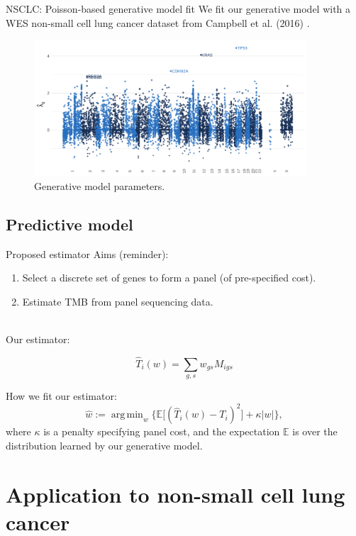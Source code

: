 \documentclass{beamer}
\DeclareMathOperator*{\argmin}{arg\,min}
\begin{document}
\begin{frame}{NSCLC: Poisson-based generative model fit}
We fit our generative model with a WES non-small cell lung cancer dataset from Campbell et al. (2016) \citep{campbell_distinct_2016}.
\begin{figure}[htbp]
\centering
\includegraphics[width=4in]{figures/fig4.png}
\caption{Generative model parameters. \citep{bradley_data-driven_2021}\label{fig:3}}
\end{figure}
\end{frame}



\subsection{Predictive model}
\begin{frame}{Proposed estimator}
Aims (reminder): 

\begin{enumerate}[1]
\item Select a discrete set of genes to form a panel (of pre-specified cost). 
\item Estimate TMB from panel sequencing data.
\end{enumerate} 
~\\
Our estimator:

\begin{equation}
    \hat{T}_i(w) = \sum_{g,s} w_{gs} M_{igs}
\end{equation}

How we fit our estimator:
\begin{equation}
    \hat{w} := \argmin_w \bigg\{ \mathbb{E}\big[(\hat{T}_i(w) - T_i)^2\big] + \kappa |w| \bigg\} ,
\end{equation}
where $\kappa$ is a penalty specifying panel cost, and the expectation $\mathbb{E}$ is over the distribution learned by our generative model.
\end{frame}



\section{Application to non-small cell lung cancer}
\end{document}
